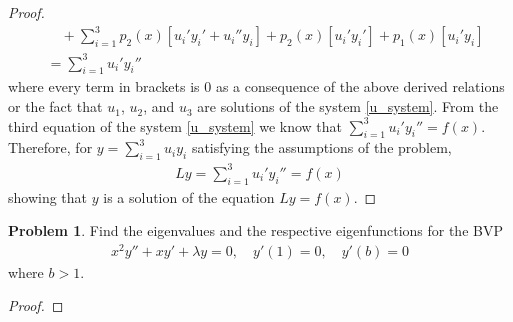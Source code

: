 \documentclass[12pt]{article}
\theoremstyle{definition}
\newtheorem{problem}{Problem}
\begin{document}
\begin{proof}
\begin{align*}
    &\quad + \sum_{i=1}^{3} p_2(x)[u_i'y_i' + u_i''y_i] + p_2(x)[u_i'y_i'] + p_1(x)[u_i'y_i] \\
    &= \sum_{i=1}^3 u_i' y_i''
  \end{align*}
  where every term in brackets is 0 as a consequence of the above derived relations or
  the fact that $u_1$, $u_2$, and $u_3$ are solutions of the system \eqref{u_system}.
  From the third equation of the system \eqref{u_system} we know that $\sum_{i=1}^3 u_i' y_i'' = f(x)$.
  Therefore, for $y = \sum_{i=1}^{3} u_i y_i$ satisfying the assumptions of the problem,
  \begin{align*}
    Ly = \sum_{i=1}^3 u_i' y_i'' = f(x)
  \end{align*}
  showing that $y$ is a solution of the equation $Ly = f(x)$.
\end{proof}
\newpage


\begin{problem}
  Find the eigenvalues and the respective eigenfunctions for the BVP
  \begin{align*}
    x^2y'' + xy' + \lambda y = 0, \quad y'(1) = 0, \quad y'(b) = 0
  \end{align*}
  where $b > 1$.
\end{problem}

\begin{proof}
\end{proof}
\end{document}
